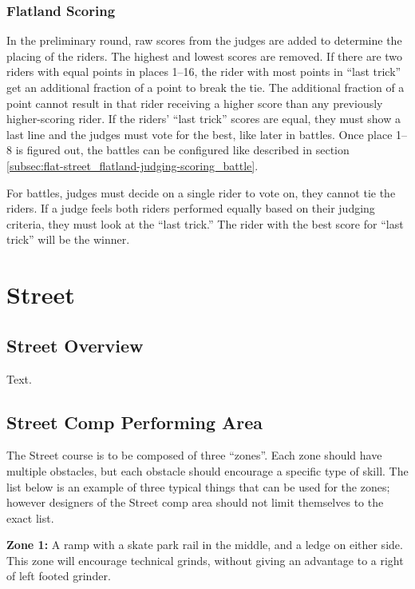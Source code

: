 \subsection{Flatland Scoring}
In the preliminary round, raw scores from the judges are added to determine the placing of the riders.
The highest and lowest scores are removed.
If there are two riders with equal points in places 1–16, the rider with most points in ``last trick'' get an additional fraction of a point to break the tie.
The additional fraction of a point cannot result in that rider receiving a higher score than any previously higher-scoring rider.
If the riders' ``last trick'' scores are equal, they must show a last line and the judges must vote for the best, like later in battles.
Once place 1–8 is figured out, the battles can be configured like described in section \ref{subsec:flat-street_flatland-judging-scoring_battle}.

For battles, judges must decide on a single rider to vote on, they cannot tie the riders.
If a judge feels both riders performed equally based on their judging criteria, they must look at the ``last trick.''
The rider with the best score for ``last trick'' will be the winner.

\chapter{Street}

\section{Street Overview \label{sec:flat-street_street-overview}}
Text.

\section{Street Comp Performing Area \label{sec:flat-street_street-performing-area}}
The Street course is to be composed of three ``zones''.
Each zone should have multiple obstacles, but each obstacle should encourage a specific type of skill.
The list below is an example of three typical things that can be used for the zones; however designers of the Street comp area should not limit themselves to the exact list.

\textbf{Zone 1:}
A ramp with a skate park rail in the middle, and a ledge on either side.
This zone will encourage technical grinds, without giving an advantage to a right of left footed grinder.

